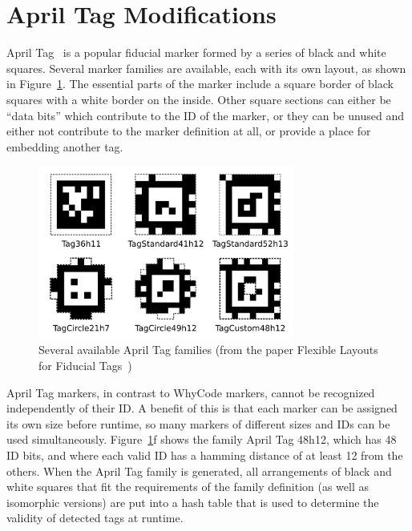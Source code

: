 \section{April Tag Modifications}
\label{section:apriltag_modifications}

April Tag~\cite{apriltag_paper}\cite{apriltag2_paper}\cite{apriltag3_paper} is a popular fiducial marker formed by a series of black and white squares.
Several marker families are available, each with its own layout, as shown in Figure~\ref{figure:apriltags}.
The essential parts of the marker include a square border of black squares with a white border on the inside.
Other square sections can either be ``data bits'' which contribute to the ID of the marker,
or they can be unused and either not contribute to the marker definition at all, or provide a place for embedding another tag.

\begin{figure}
    \centering
    \includegraphics[width=0.75\textwidth]{images/apriltags}
    \caption{Several available April Tag families (from the paper Flexible Layouts for Fiducial Tags~\cite{apriltag3_paper})}
    \label{figure:apriltags}
\end{figure}

April Tag markers, in contrast to WhyCode markers, cannot be recognized independently of their ID.
A benefit of this is that each marker can be assigned its own size before runtime,
so many markers of different sizes and IDs can be used simultaneously.
Figure~\ref{figure:apriltags}f shows the family April Tag 48h12, which has 48 ID bits,
and where each valid ID has a hamming distance of at least 12 from the others.
When the April Tag family is generated, all arrangements of black and white squares
that fit the requirements of the family definition (as well as isomorphic versions)
are put into a hash table that is used to determine the validity of detected tags at runtime.

